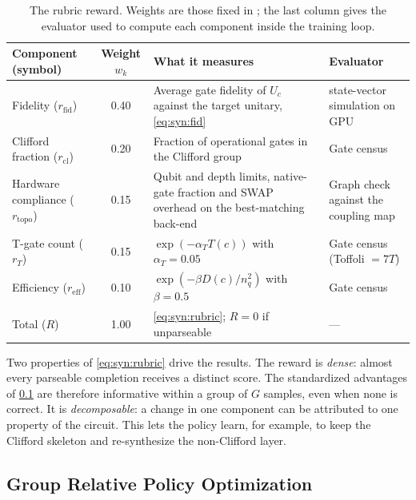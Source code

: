 \begin{table}[htbp]
\caption{The \rubriq{} rubric reward. Weights are those fixed in \cite{guo2026rubriq}; the last column gives the evaluator used to compute each component inside the training loop.}
\label{tab:syn:rubric}
\centering\footnotesize
\begin{tabularx}{\textwidth}{@{}l c X X@{}}
\toprule
Component (symbol) & Weight $w_k$ & What it measures & Evaluator \\
\midrule
Fidelity ($r_{\mathrm{fid}}$) & 0.40 & Average gate fidelity of $U_c$ against the target unitary, \cref{eq:syn:fid} & \cudaq{} state-vector simulation on GPU \\
Clifford fraction ($r_{\mathrm{cl}}$) & 0.20 & Fraction of operational gates in the Clifford group & Gate census \\
Hardware compliance ($r_{\mathrm{topo}}$) & 0.15 & Qubit and depth limits, native-gate fraction and SWAP overhead on the best-matching back-end & Graph check against the coupling map \\
T-gate count ($r_{T}$) & 0.15 & $\exp(-\alpha_T T(c))$ with $\alpha_T=0.05$ & Gate census (Toffoli $=7T$) \\
Efficiency ($r_{\mathrm{eff}}$) & 0.10 & $\exp(-\beta D(c)/n_q^{2})$ with $\beta=0.5$ & Gate census \\
\midrule
Total ($R$) & 1.00 & \cref{eq:syn:rubric}; $R=0$ if unparseable & --- \\
\bottomrule
\end{tabularx}
\end{table}

Two properties of \cref{eq:syn:rubric} drive the results. The reward is \emph{dense}: almost every parseable completion receives a distinct score. The standardized advantages of \cref{sec:syn:grpo} are therefore informative within a group of $G$ samples, even when none is correct. It is \emph{decomposable}: a change in one component can be attributed to one property of the circuit. This lets the policy learn, for example, to keep the Clifford skeleton and re-synthesize the non-Clifford layer.

\subsection{Group Relative Policy Optimization}\label{sec:syn:grpo}


